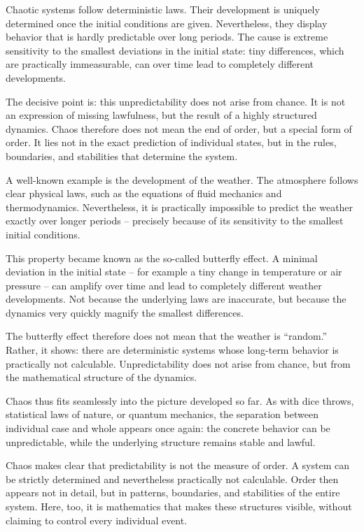 Chaotic systems follow deterministic laws.
Their development is uniquely determined
once the initial conditions are given.
Nevertheless, they display behavior
that is hardly predictable over long periods.
The cause is extreme sensitivity
to the smallest deviations in the initial state:
tiny differences,
which are practically immeasurable,
can over time
lead to completely different developments.

The decisive point is:
this unpredictability does not arise from chance.
It is not an expression of missing lawfulness,
but the result of a highly structured dynamics.
Chaos therefore does not mean the end of order,
but a special form of order.
It lies not in the exact prediction of individual states,
but in the rules,
boundaries,
and stabilities
that determine the system.

A well-known example is the development of the weather.
The atmosphere follows clear physical laws,
such as the equations of fluid mechanics
and thermodynamics.
Nevertheless, it is practically impossible
to predict the weather exactly over longer periods --
precisely because of its sensitivity to the smallest initial conditions.

This property became known
as the so-called butterfly effect.
A minimal deviation in the initial state --
for example a tiny change in temperature or air pressure --
can amplify over time
and lead to completely different weather developments.
Not because the underlying laws are inaccurate,
but because the dynamics
very quickly magnify the smallest differences.

The butterfly effect therefore does not mean
that the weather is ``random.''
Rather, it shows:
there are deterministic systems
whose long-term behavior is practically not calculable.
Unpredictability does not arise from chance,
but from the mathematical structure of the dynamics.

Chaos thus fits seamlessly
into the picture developed so far.
As with dice throws,
statistical laws of nature,
or quantum mechanics,
the separation between individual case and whole
appears once again:
the concrete behavior can be unpredictable,
while the underlying structure
remains stable and lawful.

Chaos makes clear
that predictability is not the measure of order.
A system can be strictly determined
and nevertheless practically not calculable.
Order then appears not in detail,
but in patterns,
boundaries,
and stabilities of the entire system.
Here, too, it is mathematics
that makes these structures visible,
without claiming
to control every individual event.

